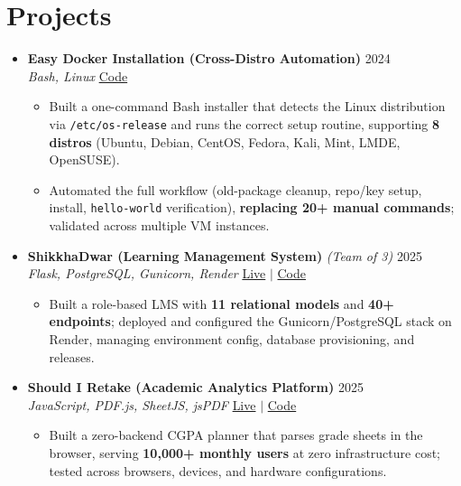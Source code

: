 \documentclass[a4paper]{article}
\newcommand{\resumeItem}[1]{
  \item\small{
    {#1 \vspace{-2pt}}
  }
}
\newcommand{\resumeItemListStart}{\begin{itemize}}
\newcommand{\resumeItemListEnd}{\end{itemize}\vspace{-5pt}}
\begin{document}
\section{Projects}
  \begin{itemize}[leftmargin=0.15in, label={}, itemsep=6pt]

    \item
    \textbf{Easy Docker Installation (Cross-Distro Automation)} \hfill 2024\\
    \small\textit{Bash, Linux} \hfill
    \href{https://github.com/badhon495/Easy_Docker_Installation}{Code}
    \vspace{-5pt}
    \resumeItemListStart
      \resumeItem{Built a one-command Bash installer that detects the Linux distribution via \texttt{/etc/os-release} and runs the correct setup routine, supporting \textbf{8 distros} (Ubuntu, Debian, CentOS, Fedora, Kali, Mint, LMDE, OpenSUSE).}
      \resumeItem{Automated the full workflow (old-package cleanup, repo/key setup, install, \texttt{hello-world} verification), \textbf{replacing 20+ manual commands}; validated across multiple VM instances.}
    \resumeItemListEnd

    \item
    \textbf{ShikkhaDwar (Learning Management System)} \textit{\small (Team of 3)} \hfill 2025\\
    \small\textit{Flask, PostgreSQL, Gunicorn, Render} \hfill
    \href{https://shikkhadwar-81r2.onrender.com/}{Live} $|$
    \href{https://github.com/nihal-kabir/ShikkhaDwar}{Code}
    \vspace{-5pt}
    \resumeItemListStart
      \resumeItem{Built a role-based LMS with \textbf{11 relational models} and \textbf{40+ endpoints}; deployed and configured the Gunicorn/PostgreSQL stack on Render, managing environment config, database provisioning, and releases.}
    \resumeItemListEnd

    \item
    \textbf{Should I Retake (Academic Analytics Platform)} \hfill 2025\\
    \small\textit{JavaScript, PDF.js, SheetJS, jsPDF} \hfill
    \href{https://badhon495.github.io/should-i-retake/}{Live} $|$
    \href{https://github.com/badhon495/should-i-retake}{Code}
    \vspace{-5pt}
    \resumeItemListStart
      \resumeItem{Built a zero-backend CGPA planner that parses grade sheets in the browser, serving \textbf{10,000+ monthly users} at zero infrastructure cost; tested across browsers, devices, and hardware configurations.}
    \resumeItemListEnd

  \end{itemize}
\end{document}
